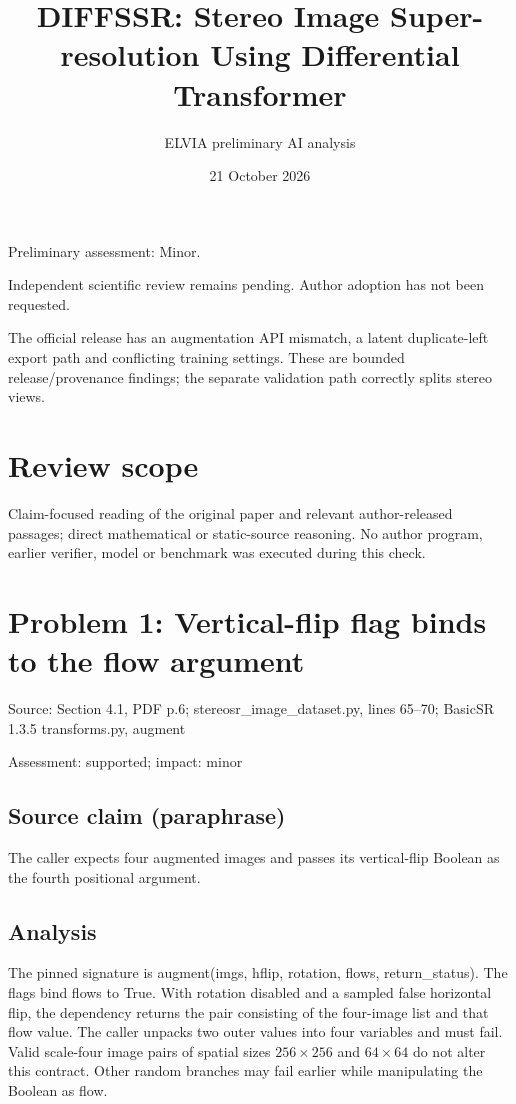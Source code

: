 \documentclass[11pt]{article}
\begin{document}
\title{DIFFSSR: Stereo Image Super-resolution Using Differential Transformer}

\author{ELVIA preliminary AI analysis}\date{21 October 2026}\maketitle

Preliminary assessment: Minor.\par

Independent scientific review remains pending. Author adoption has not been requested.

The official release has an augmentation API mismatch, a latent duplicate-left export path and conflicting training settings. These are bounded release/provenance findings; the separate validation path correctly splits stereo views.

\section*{Review scope}

Claim-focused reading of the original paper and relevant author-released passages; direct mathematical or static-source reasoning. No author program, earlier verifier, model or benchmark was executed during this check.

\section*{Problem 1: Vertical-flip flag binds to the flow argument}

Source: Section 4.1, PDF p.6; stereosr\_image\_dataset.py, lines 65–70; BasicSR 1.3.5 transforms.py, augment

Assessment: supported; impact: minor

\subsection*{Source claim (paraphrase)}

The caller expects four augmented images and passes its vertical-flip Boolean as the fourth positional argument.

\subsection*{Analysis}

The pinned signature is augment(imgs, hflip, rotation, flows, return\_status). The flags bind flows to True. With rotation disabled and a sampled false horizontal flip, the dependency returns the pair consisting of the four-image list and that flow value. The caller unpacks two outer values into four variables and must fail. Valid scale-four image pairs of spatial sizes \(256\times256\) and \(64\times64\) do not alter this contract. Other random branches may fail earlier while manipulating the Boolean as flow.
\end{document}
